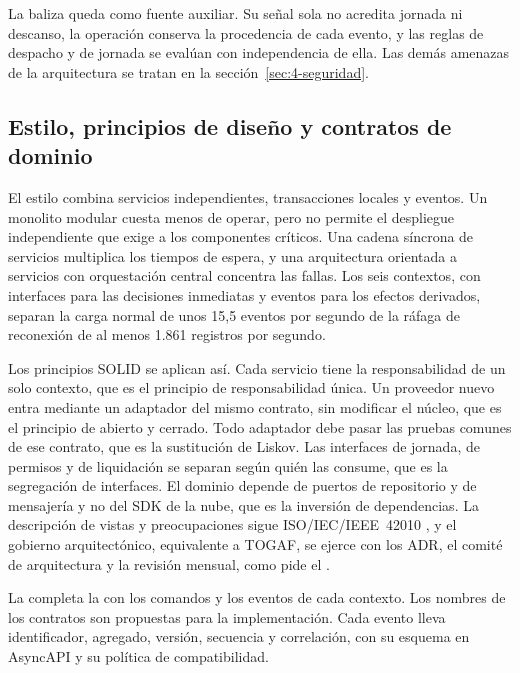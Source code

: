 La baliza queda como fuente auxiliar. Su señal sola no acredita jornada ni descanso, la operación
conserva la procedencia de cada evento, y las reglas de despacho y de jornada se evalúan con
independencia de ella. Las demás amenazas de la arquitectura se tratan en la
sección~\ref{sec:4-seguridad}.

\subsection{Estilo, principios de diseño y contratos de dominio}\label{sec:4-estilo}

El estilo combina servicios independientes, transacciones locales y eventos. Un monolito modular cuesta
menos de operar, pero no permite el despliegue independiente que  exige a los
componentes críticos. Una cadena síncrona de servicios multiplica los tiempos de espera, y una
arquitectura orientada a servicios con orquestación central concentra las fallas. Los seis contextos,
con interfaces para las decisiones inmediatas y eventos para los efectos derivados, separan la carga
normal de unos 15,5 eventos por segundo de la ráfaga de reconexión de al menos 1.861 registros por
segundo.

Los principios SOLID se aplican así. Cada servicio tiene la responsabilidad de un solo contexto, que es
el principio de responsabilidad única. Un proveedor nuevo entra mediante un adaptador del mismo
contrato, sin modificar el núcleo, que es el principio de abierto y cerrado. Todo adaptador debe pasar
las pruebas comunes de ese contrato, que es la sustitución de Liskov. Las interfaces de jornada, de
permisos y de liquidación se separan según quién las consume, que es la segregación de interfaces. El
dominio depende de puertos de repositorio y de mensajería y no del SDK de la nube, que es la inversión
de dependencias. La descripción de vistas y preocupaciones sigue ISO/IEC/IEEE~42010
\parencite{iso42010}, y el gobierno arquitectónico, equivalente a TOGAF, se ejerce con los ADR, el
comité de arquitectura y la revisión mensual, como pide el .

La  completa la  con los comandos y los eventos de cada
contexto. Los nombres de los contratos son propuestas para la implementación. Cada evento lleva
identificador, agregado, versión, secuencia y correlación, con su esquema en AsyncAPI y su política de
compatibilidad.

